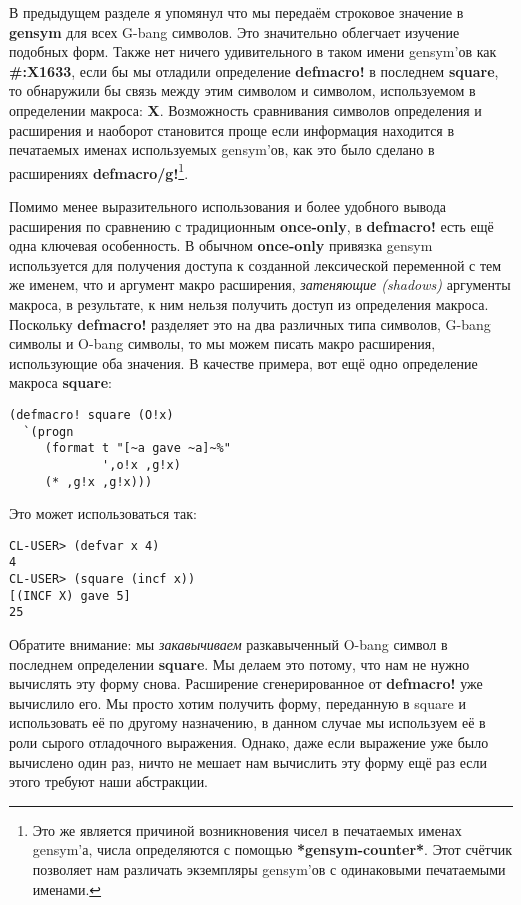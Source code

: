 В предыдущем разделе я упомянул что мы передаём строковое значение в \textbf{gensym} для всех G-bang символов. Это значительно облегчает изучение подобных форм. Также нет ничего удивительного в таком имени gensym'ов как \textbf{\#:X1633}, если бы мы отладили определение \textbf{defmacro!} в последнем \textbf{square}, то обнаружили бы связь между этим символом и символом, используемом в определении макроса: \textbf{X}. Возможность сравнивания символов определения и расширения и наоборот становится проще если информация находится в печатаемых именах используемых gensym'ов, как это было сделано в расширениях \textbf{defmacro/g!}\footnote{Это же является причиной возникновения чисел в печатаемых именах gensym'а, числа определяются с помощью \textbf{*gensym-counter*}. Этот счётчик позволяет нам различать экземпляры gensym'ов с одинаковыми печатаемыми именами.}.

Помимо менее выразительного использования и более удобного вывода расширения по сравнению с традиционным \textbf{once-only}, в \textbf{defmacro!} есть ещё одна ключевая особенность. В обычном \textbf{once-only} привязка gensym используется для получения доступа к созданной лексической переменной с тем же именем, что и аргумент макро расширения, \emph{затеняющие (shadows)} аргументы макроса, в результате, к ним нельзя получить доступ из определения макроса. Поскольку \textbf{defmacro!} разделяет это на два различных типа символов, G-bang символы и O-bang символы, то мы можем писать макро расширения, использующие оба значения. В качестве примера, вот ещё одно определение макроса \textbf{square}:

\begin{verbatim}
(defmacro! square (O!x)
  `(progn
     (format t "[~a gave ~a]~%"
             ',o!x ,g!x)
     (* ,g!x ,g!x)))
\end{verbatim}

Это может использоваться так:

\begin{verbatim}
CL-USER> (defvar x 4)
4
CL-USER> (square (incf x))
[(INCF X) gave 5]
25
\end{verbatim}

Обратите внимание: мы \emph{закавычиваем} разкавыченный O-bang символ в последнем определении \textbf{square}. Мы делаем это потому, что нам не нужно вычислять эту форму снова. Расширение сгенерированное от \textbf{defmacro!} уже вычислило его. Мы просто хотим получить форму, переданную в square и использовать её по другому назначению, в данном случае мы используем её в роли сырого отладочного выражения. Однако, даже если выражение уже было вычислено один раз, ничто не мешает нам вычислить эту форму ещё раз если этого требуют наши абстракции.

